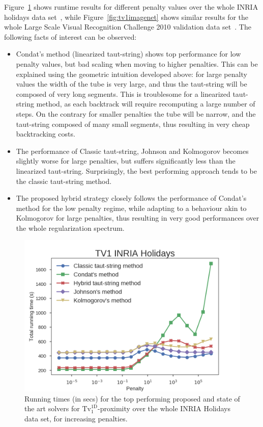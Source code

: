 \documentclass[twoside,11pt]{article}
\newcommand{\tvell}{\text{Tv}}
\newcommand{\oned}{\text{1D}}
\numberwithin{equation}{section}
\numberwithin{theorem}{section}
\begin{document}
Figure~\ref{fig:tv1inria} shows runtime results for different penalty values over the whole INRIA holidays data set~\citep{INRIAholidays}, while Figure~\ref{fig:tv1imagenet} shows similar results for the whole Large Scale Visual Recognition Challenge 2010 validation data set~\citep{Imagenet}. The following facts of interest can be observed:

\begin{itemize}
 \item Condat's method (linearized taut-string) shows top performance for low penalty values, but bad scaling when moving to higher penalties. This can be explained using the geometric intuition developed above: for large penalty values the width of the tube is very large, and thus the taut-string will be composed of very long segments. This is troublesome for a linearized taut-string method, as each backtrack will require recomputing a large number of steps. On the contrary for smaller penalties the tube will be narrow, and the taut-string composed of many small segments, thus resulting in very cheap backtracking costs.
 \item The performance of Classic taut-string, Johnson and Kolmogorov becomes slightly worse for large penalties, but suffers significantly less than the linearized taut-string. Surprisingly, the best performing approach tends to be the classic taut-string method.
 \item The proposed hybrid strategy closely follows the performance of Condat's method for the low penalty regime, while adapting to a behaviour akin to Kolmogorov for large penalties, thus resulting in very good performances over the whole regularization spectrum.
\end{itemize}

\begin{figure}[ht]
  \centering
  \includegraphics[width = \textwidth]{imagesBenchmarkINRIA}
  \caption{Running times (in secs) for the top performing proposed and state of the art solvers for $\tvell_1^{\oned}$-proximity over the whole INRIA Holidays data set, for increasing penalties.
   }   \label{fig:tv1inria}
\end{figure}
\end{document}
